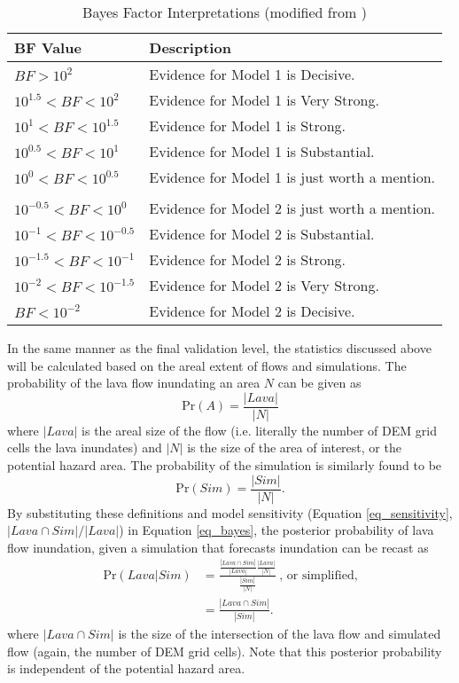	\begin{table}[h]
		\centering
		\caption{Bayes Factor Interpretations (modified from \citet{aspinall2003evidence})}
		\begin{tabular}{l l}
			\toprule
			BF Value & Description\\
			\midrule
			$BF>10^2$ & Evidence for Model 1 is Decisive.\\
			$10^{1.5}<BF<10^2$ & Evidence for Model 1 is Very Strong.\\
			$10^{1}<BF<10^{1.5}$ & Evidence for Model 1 is Strong.\\
			$10^{0.5}<BF<10^{1}$ & Evidence for Model 1 is Substantial.\\
			$10^{0}<BF<10^{0.5}$ & Evidence for Model 1 is just worth a mention.\\\\
			$10^{-0.5}<BF<10^{0}$ & Evidence for Model 2 is just worth a mention.\\
			$10^{-1}<BF<10^{-0.5}$ & Evidence for Model 2 is Substantial.\\
			$10^{-1.5}<BF<10^{-1}$ & Evidence for Model 2 is Strong.\\
			$10^{-2}<BF<10^{-1.5}$ & Evidence for Model 2 is Very Strong.\\
			$BF<10^{-2}$ & Evidence for Model 2 is Decisive.\\
			\bottomrule
		\end{tabular}
		\label{tab_BFinterps}
	\end{table}
	
		In the same manner as the final validation level, the statistics discussed above will be calculated based on the areal extent of flows and simulations. The probability of the lava flow inundating an area $N$ can be given as
		\begin{equation}
			\text{Pr}(A)=\frac{|Lava|}{|N|}\label{eq_PA}
		\end{equation}
		where $|Lava|$ is the areal size of the flow (i.e. literally the number of DEM grid cells the lava inundates) and $|N|$ is the size of the area of interest, or the potential hazard area. The probability of the simulation is similarly found to be
		\begin{equation}
			\text{Pr}(Sim)=\frac{|Sim|}{|N|}.\label{eq_PB}
		\end{equation}
		By substituting these definitions and model sensitivity (Equation \ref{eq_sensitivity}, $|Lava \cap Sim|/|Lava|$) in Equation \ref{eq_bayes}, the posterior probability of lava flow inundation, given a simulation that forecasts inundation can be recast as
		\begin{align}
		\text{Pr}(Lava|Sim)&=\frac{\frac{|Lava\cap Sim|}{|Lava|}\frac{|Lava|}{|N|}}{\frac{|Sim|}{|N|}}~\text{,~or~simplified,}\label{eq_unsimplepost}\\
		&=\frac{|Lava\cap Sim|}{|Sim|}.\label{eq_simplepost}
		\end{align}
		where $|Lava\cap Sim|$ is the size of the intersection of the lava flow and simulated flow (again, the number of DEM grid cells). Note that this posterior probability is independent of the potential hazard area.
		
